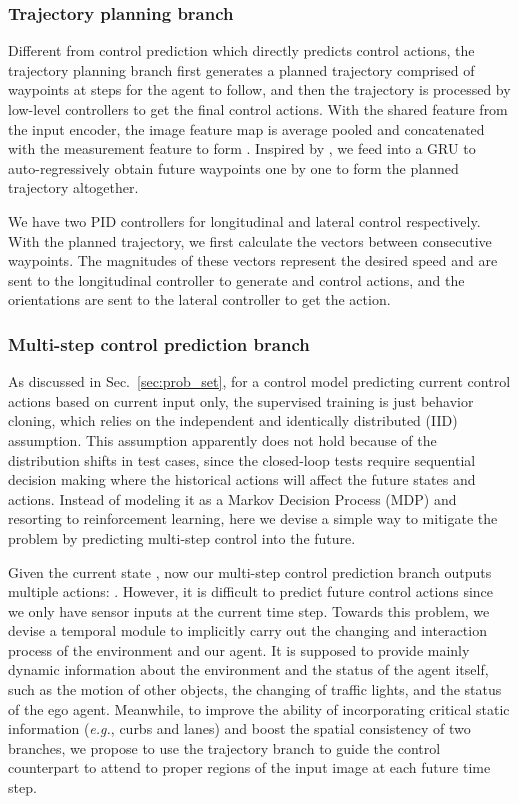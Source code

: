 \documentclass{article}
\begin{document}
\subsubsection{Trajectory planning branch} \label{sec:traj_branch}
Different from control prediction which directly predicts control actions, the trajectory planning branch first generates a planned trajectory comprised of waypoints at  steps for the agent to follow, and then the trajectory is processed by low-level controllers to get the final control actions.
With the shared feature from the input encoder, the image feature map  is average pooled and concatenated with the measurement feature  to form . Inspired by \citep{prakash2021transfuser}, we feed  into a GRU \citep{GRU} to auto-regressively obtain future waypoints one by one to form the planned trajectory altogether. 

We have two PID controllers for longitudinal and lateral control respectively. With the planned trajectory, we first calculate the vectors between consecutive waypoints. The magnitudes of these vectors represent the desired speed and are sent to the longitudinal controller to generate  and  control actions, and the orientations are sent to the lateral controller to get the  action.





\subsubsection{Multi-step control prediction branch} \label{sec:ctl_branch}
As discussed in Sec.~\ref{sec:prob_set}, for a control model predicting current control actions based on current input only, the supervised training is just behavior cloning, which relies on the independent and identically distributed (IID) assumption.
This assumption apparently does not hold because of the distribution shifts in test cases, since the closed-loop tests require sequential decision making where the historical actions will affect the future states and actions.
Instead of modeling it as a Markov Decision Process (MDP) and resorting to reinforcement learning, here we devise a simple way to mitigate the problem by predicting multi-step control into the future. 

Given the current state , now our multi-step control prediction branch outputs multiple actions: .
However, it is difficult to predict future control actions since we only have sensor inputs at the current time step. Towards this problem, we devise a temporal module to implicitly carry out the changing and interaction process of the environment and our agent. It is supposed to provide mainly dynamic information about the environment and the status of the agent itself, such as the motion of other objects, the changing of traffic lights, and the status of the ego agent.
Meanwhile, to improve the ability of incorporating critical static information (\textit{e.g.}, curbs and lanes) and boost the spatial consistency of two branches,
we propose to use the trajectory branch to guide the control counterpart to attend to proper regions of the input image at each future time step.  
\end{document}
